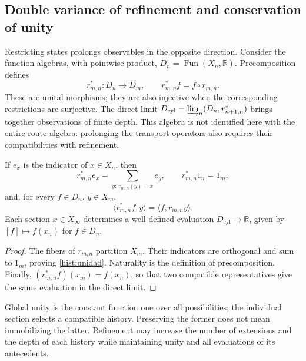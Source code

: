 \subsection{Double variance of refinement and conservation of unity}
\label{hist:doble-varianza}

Restricting states prolongs observables in the opposite direction.
Consider the function algebras, with pointwise product,
\(D_n=\operatorname{Fun}(X_n,\mathbb R)\). Precomposition defines
\begin{equation}
 r_{m,n}^*:D_n\longrightarrow D_m,
 \qquad r_{m,n}^*f=f\circ r_{m,n}.
 \label{hist:precomposicion}
\end{equation}
These are unital morphisms; they are also injective when the corresponding
restrictions are surjective. The direct limit
\(D_{\mathrm{cyl}}=\varinjlim_n(D_n,r_{n+1,n}^*)\) brings together
observations of finite depth. This algebra is not identified here
with the entire route algebra: prolonging the transport operators also requires
their compatibilities with refinement.

\begin{lemma}
If \(e_x\) is the indicator of \(x\in X_n\), then
\begin{equation}
 r_{m,n}^*e_x=\sum_{y:\,r_{m,n}(y)=x}e_y,
 \qquad r_{m,n}^*1_n=1_m,
 \label{hist:unidad}
\end{equation}
and, for every \(f\in D_n\), \(y\in X_m\),
\[
 \langle r_{m,n}^*f,y\rangle=\langle f,r_{m,n}y\rangle.
\]
Each section \(x\in X_\infty\) determines a well-defined evaluation
\(D_{\mathrm{cyl}}\to\mathbb R\), given by \([f]\mapsto f(x_n)\)
for \(f\in D_n\).
\end{lemma}
\begin{proof}
The fibers of \(r_{m,n}\) partition \(X_m\). Their
indicators are orthogonal and sum to \(1_m\), proving
\eqref{hist:unidad}. Naturality is the definition of precomposition.
Finally, \((r_{m,n}^*f)(x_m)=f(x_n)\), so that two compatible
representatives give the same evaluation in the direct limit.
\end{proof}

Global unity is the constant function one over all possibilities;
the individual section selects a compatible history. Preserving the
former does not mean immobilizing the latter. Refinement may increase
the number of extensions and the depth of each history while maintaining
unity and all evaluations of its antecedents.

